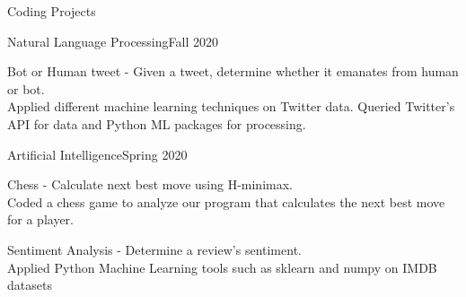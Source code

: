 \documentclass{resume} %
\begin{document}
\begin{rSection}{Coding Projects}
    \begin{rSubsection}{Natural Language Processing}{Fall 2020}{}{}
        \item Bot or Human tweet - Given a tweet, determine whether it emanates from human or bot.\\
           Applied different machine learning techniques on Twitter data. Queried Twitter's API for data
           and Python ML packages for processing.

    \end{rSubsection}

    \begin{rSubsection}{Artificial Intelligence}{Spring 2020}{}{}
        \item Chess - Calculate next best move using H-minimax. \\
            Coded a chess game to analyze our program that calculates the next best move for a player.
        \item Sentiment Analysis - Determine a review's sentiment.\\
            Applied Python Machine Learning tools such as sklearn and numpy on IMDB  datasets
    \end{rSubsection}


\end{rSection}
\end{document}
